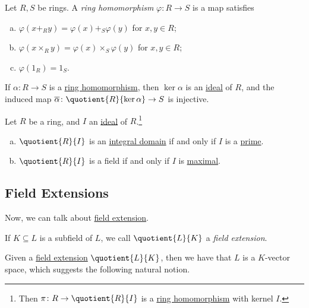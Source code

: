 \begin{prev}\label{prev:ring-homomorphism}
	Let \(R, S\) be rings. A \emph{ring homomorphism} \(\varphi \colon R \to S\) is a map satisfies
	\begin{enumerate}[(a)]
		\item \(\varphi (x +_R y) = \varphi (x) +_S \varphi (y)\) for \(x, y\in R\);
		\item \(\varphi (x \times_R y) = \varphi (x) \times_S \varphi (y)\) for \(x, y\in R\);
		\item \(\varphi (1_R) = 1_S\).
	\end{enumerate}
\end{prev}

\begin{theorem}
	If \(\alpha \colon R \to S\) is a \hyperref[prev:ring-homomorphism]{ring homomorphism}, then \(\ker \alpha \) is an \hyperref[def:ideal]{ideal} of \(R\), and the induced map \(\overline{\alpha} \colon \quotient{R}{\ker \alpha } \to S\) is injective.
\end{theorem}

\begin{theorem}
	Let \(R\) be a ring, and \(I\) an \hyperref[def:ideal]{ideal} of \(R\).\footnote{Then \(\pi \colon R \to \quotient{R}{I} \) is a \hyperref[prev:ring-homomorphism]{ring homomorphism} with kernel \(I\).}
	\begin{enumerate}[(a)]
		\item \(\quotient{R}{I} \) is an \hyperref[def:integral-domain]{integral domain} if and only if \(I\) is a \hyperref[def:prime]{prime}.
		\item \(\quotient{R}{I} \) is a field if and only if \(I\) is \hyperref[def:proper-ideal-maximal]{maximal}.
	\end{enumerate}
\end{theorem}

\subsection{Field Extensions}
Now, we can talk about \hyperref[def:field-extension]{field extension}.

\begin{definition}\label{def:field-extension}
	If \(K \subseteq L\) is a subfield of \(L\), we call \(\quotient{L}{K} \) a \emph{field extension}.
\end{definition}

Given a \hyperref[def:field-extension]{field extension} \(\quotient{L}{K} \), then we have that \(L\) is a \(K\)-vector space, which suggests the following natural notion.

